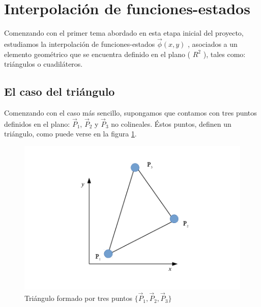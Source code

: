 \section{Interpolación de funciones-estados}

Comenzando con el primer tema abordado en esta etapa inicial del proyecto, estudiamos la interpolación de funciones-estados $\vec{ \phi } (x,y)$ , asociados a un elemento geométrico que se encuentra definido en el plano ( $R^2$ ), tales como: triángulos o cuadiláteros.

\subsection{El caso del triángulo}
\label{sec:triangulos}
Comenzando con el caso más sencillo, supongamos que contamos con tres puntos definidos en el plano: $ \vec{P}_{1} $, $ \vec{P}_{2} $ y $ \vec{P}_{3} $ no colineales. Éstos puntos, definen un triángulo, como puede verse en la figura \ref{fig:tri_simple}.

\begin{figure}
\centering
\includegraphics[scale=.8]{triangulo_simple}
\caption{\label{fig:tri_simple} Triángulo formado por tres puntos $ \lbrace \vec{P}_{1}, \vec{P}_{2}, \vec{P}_{3}  \rbrace $}
\end{figure}

